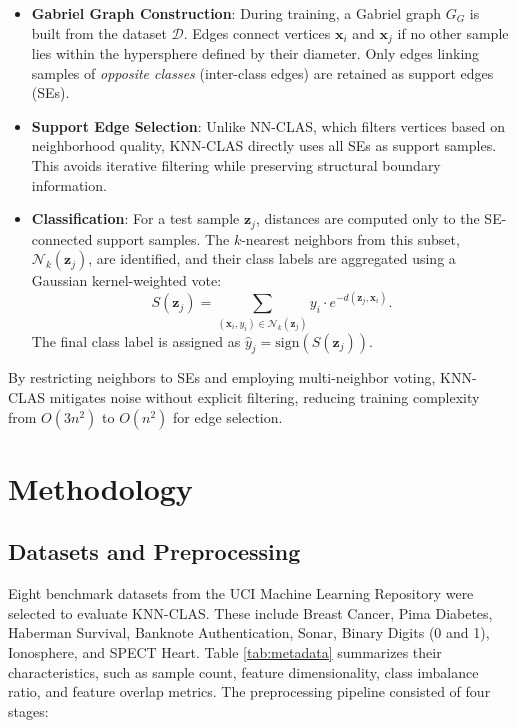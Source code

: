 \documentclass[conference]{IEEEtran}
\begin{document}
\begin{itemize}
    \item \textbf{Gabriel Graph Construction}: During training, a Gabriel graph \( G_G \) is built from the dataset \( \mathcal{D} \). Edges connect vertices \( \mathbf{x}_i \) and \( \mathbf{x}_j \) if no other sample lies within the hypersphere defined by their diameter. Only edges linking samples of \textit{opposite classes} (inter-class edges) are retained as support edges (SEs).

    \item \textbf{Support Edge Selection}: Unlike NN-CLAS, which filters vertices based on neighborhood quality, KNN-CLAS directly uses all SEs as support samples. This avoids iterative filtering while preserving structural boundary information.

    \item \textbf{Classification}: For a test sample \( \mathbf{z}_j \), distances are computed only to the SE-connected support samples. The \( k \)-nearest neighbors from this subset, \( \mathcal{N}_k(\mathbf{z}_j) \), are identified, and their class labels are aggregated using a Gaussian kernel-weighted vote:
    \[
    S(\mathbf{z}_j) = \sum_{(\mathbf{x}_i, y_i) \in \mathcal{N}_k(\mathbf{z}_j)} y_i \cdot e^{-d(\mathbf{z}_j, \mathbf{x}_i)}.
    \]
    The final class label is assigned as \( \hat{y}_j = \text{sign}(S(\mathbf{z}_j)) \).
\end{itemize}

By restricting neighbors to SEs and employing multi-neighbor voting, KNN-CLAS mitigates noise without explicit filtering, reducing training complexity from \( O(3n^2) \) to \( O(n^2) \) for edge selection.

\section{Methodology}

\subsection{Datasets and Preprocessing}


Eight benchmark datasets from the UCI Machine Learning Repository \cite{uci_breast_cancer, uci_sonar, uci_spect_heart} were selected to evaluate KNN-CLAS. These include Breast Cancer, Pima Diabetes, Haberman Survival, Banknote Authentication, Sonar, Binary Digits (0 and 1), Ionosphere, and SPECT Heart. Table \ref{tab:metadata} summarizes their characteristics, such as sample count, feature dimensionality, class imbalance ratio, and feature overlap metrics. The preprocessing pipeline consisted of four stages:
\end{document}
